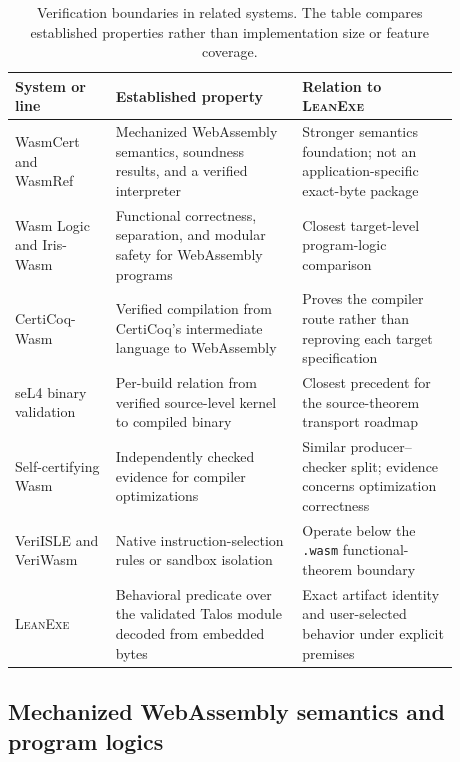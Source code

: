 \documentclass[11pt]{article}
\newcommand{\leanexe}{\textsc{LeanExe}}
\newcommand{\code}[1]{\texttt{#1}}
\begin{document}
\begin{table}[ht]
\centering
\small
\setlength{\tabcolsep}{3.5pt}
\begin{tabular}{|L{0.20\linewidth}|L{0.37\linewidth}|L{0.31\linewidth}|}
\hline
System or line & Established property & Relation to \leanexe{} \\
\hline
WasmCert and WasmRef~\cite{Watt2021Two,Watt2023WasmRef} & Mechanized WebAssembly semantics, soundness results, and a verified interpreter & Stronger semantics foundation; not an application-specific exact-byte package \\
\hline
Wasm Logic and Iris-Wasm~\cite{Watt2019WasmLogic,Rao2023IrisWasm} & Functional correctness, separation, and modular safety for WebAssembly programs & Closest target-level program-logic comparison \\
\hline
CertiCoq-Wasm~\cite{Meier2025CertiCoqWasm} & Verified compilation from CertiCoq's intermediate language to WebAssembly & Proves the compiler route rather than reproving each target specification \\
\hline
seL4 binary validation~\cite{Sewell2013KernelBinary} & Per-build relation from verified source-level kernel to compiled binary & Closest precedent for the source-theorem transport roadmap \\
\hline
Self-certifying Wasm~\cite{Namjoshi2021SelfCertifying} & Independently checked evidence for compiler optimizations & Similar producer--checker split; evidence concerns optimization correctness \\
\hline
VeriISLE and VeriWasm~\cite{VanHattum2024VeriISLE,Johnson2021VeriWasm} & Native instruction-selection rules or sandbox isolation & Operate below the \code{.wasm} functional-theorem boundary \\
\hline
\leanexe{} & Behavioral predicate over the validated Talos module decoded from embedded bytes & Exact artifact identity and user-selected behavior under explicit premises \\
\hline
\end{tabular}
\caption{Verification boundaries in related systems.  The table compares established properties rather than implementation size or feature coverage.}
\label{tab:comparison}
\end{table}

\subsection{Mechanized WebAssembly semantics and program logics}
\end{document}
